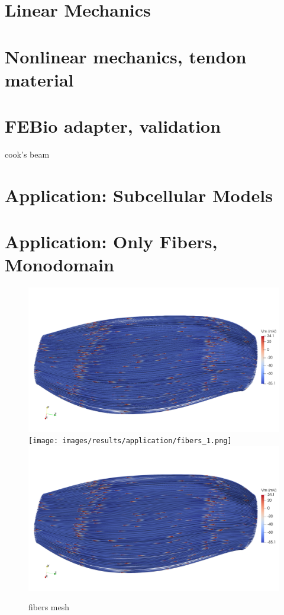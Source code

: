 \section{Linear Mechanics}
\section{Nonlinear mechanics, tendon material}
\section{FEBio adapter, validation}

cook's beam

\section{Application: Subcellular Models}
\section{Application: Only Fibers, Monodomain}

\begin{figure}[H]
  \centering%
  \includegraphics[width=\textwidth]{images/results/application/fibers_0.png}%
  \texttt{[image: images/results/application/fibers\_1.png]}%
  \includegraphics[width=\textwidth]{images/results/application/fibers_2.png}%
  \caption{fibers mesh}%
  \label{fig:multidomain_mesh}%
\end{figure}

